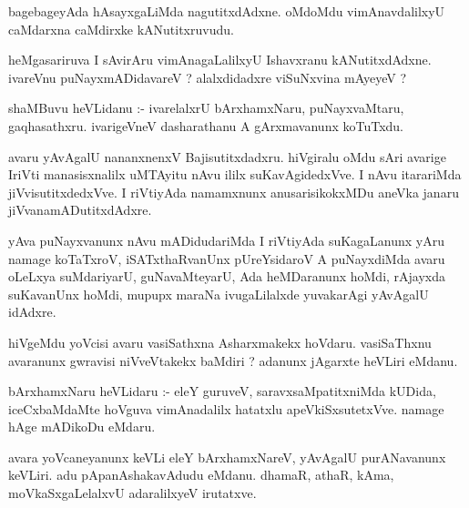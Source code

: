 \documentclass{article}
\begin{document}
\begin{mn}
bagebageyAda  hAsayxgaLiMda  nagutitxdAdxne.  oMdoMdu  vimAnavdalilxyU  caMdarxna  caMdirxke  kANutitxruvudu.
\end{mn}

\begin{mn}
heMgasariruva  I  sAvirAru  vimAnagaLalilxyU  Ishavxranu  kANutitxdAdxne.  ivareVnu  puNayxmADidavareV ?  
alalxdidadxre  viSuNxvina  mAyeyeV ? 
\end{mn}

\begin{mn}
shaMBuvu  heVLidanu :- ivarelalxrU  bArxhamxNaru,  puNayxvaMtaru,  gaqhasathxru.  ivarigeVneV  dasharathanu  
A  gArxmavanunx  koTuTxdu.
\end{mn}

\begin{mn}
avaru  yAvAgalU  nananxnenxV  Bajisutitxdadxru.  hiVgiralu  oMdu  sAri  avarige  IriVti  manasisxnalilx  
uMTAyitu  nAvu  ililx  suKavAgidedxVve.  I nAvu  itarariMda  jiVvisutitxdedxVve.  I  riVtiyAda  
namamxnunx  anusarisikokxMDu  aneVka  janaru  jiVvanamADutitxdAdxre.
\end{mn}

\begin{mn}
yAva  puNayxvanunx  nAvu  mADidudariMda  I  riVtiyAda  suKagaLanunx  yAru  namage  koTaTxroV,  iSATxthaRvanUnx  
pUreYsidaroV  A  puNayxdiMda  avaru  oLeLxya  suMdariyarU,  guNavaMteyarU,  Ada  heMDaranunx  hoMdi,  rAjayxda  
suKavanUnx  hoMdi,  mupupx  maraNa  ivugaLilalxde  yuvakarAgi  yAvAgalU  idAdxre.
\end{mn}

\begin{mn}
hiVgeMdu  yoVcisi  avaru  vasiSathxna  Asharxmakekx  hoVdaru.  vasiSaThxnu  avaranunx  gwravisi  niVveVtakekx  
baMdiri ?  adanunx  jAgarxte  heVLiri  eMdanu.
\end{mn}

\begin{mn}
bArxhamxNaru  heVLidaru :- eleY  guruveV,  saravxsaMpatitxniMda  kUDida,  iceCxbaMdaMte  hoVguva  vimAnadalilx  
hatatxlu  apeVkiSxsutetxVve.  namage  hAge  mADikoDu  eMdaru.
\end{mn}

\begin{mn}
avara  yoVcaneyanunx  keVLi  eleY  bArxhamxNareV,  yAvAgalU  purANavanunx  keVLiri.  adu  pApanAshakavAdudu  
eMdanu.  dhamaR,  athaR,  kAma,  moVkaSxgaLelalxvU  adaralilxyeV  irutatxve.
\end{mn}
\end{document}
